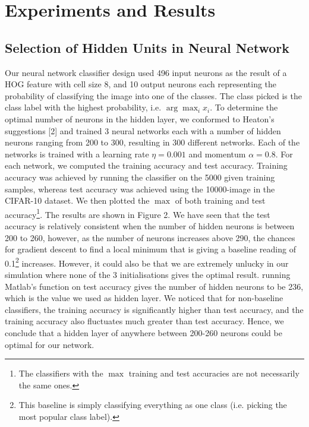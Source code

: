 \documentclass{article} %
\begin{document}
\section{Experiments and Results}

\subsection{Selection of Hidden Units in Neural Network}

Our neural network classifier design used 496 input neurons as the result of a HOG feature with cell size 8, and 10 output neurons each representing the probability of classifying the image into one of the classes. The class picked is the class label with the highest probability, i.e. $\arg\max_i {x_i}$. To determine the optimal number of neurons in the hidden layer, we conformed to Heaton's suggestions [2] and trained 3 neural networks each with a number of hidden neurons ranging from 200 to 300, resulting in 300 different networks. Each of the networks is trained with a learning rate $\eta=0.001$ and momentum $\alpha=0.8$. For each network, we computed the training accuracy and test accuracy. Training accuracy was achieved by running the classifier on the 5000 given training samples, whereas test accuracy was achieved using the 10000-image  in the CIFAR-10 dataset. We then plotted the $\max$ of both training and test accuracy\footnote{The classifiers with the $\max$ training and test accuracies are not necessarily the same ones.}. The results are shown in Figure 2. We have seen that the test accuracy is relatively consistent when the number of hidden neurons is between 200 to 260, however, as the number of neurons increases above 290, the chances for gradient descent to find a local minimum that is giving a baseline reading of 0.1\footnote{This baseline is simply classifying everything as one class (i.e. picking the most popular class label).} increases. However, it could also be that we are extremely unlucky in our simulation where none of the 3 initialisations gives the optimal result. running Matlab's  function on test accuracy gives the number of hidden neurons to be 236, which is the value we used as hidden layer. We noticed that for non-baseline classifiers, the training accuracy is significantly higher than test accuracy, and the training accuracy also fluctuates much greater than test accuracy. Hence, we conclude that a hidden layer of anywhere between 200-260 neurons could be optimal for our network.
\end{document}
